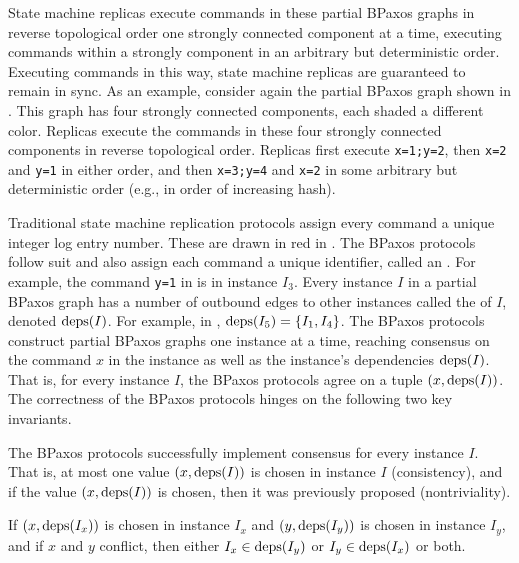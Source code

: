 State machine replicas execute commands in these partial BPaxos graphs in
reverse topological order one strongly connected component at a time, executing
commands within a strongly component in an arbitrary but deterministic order.
Executing commands in this way, state machine replicas are guaranteed to remain
in sync. As an example, consider again the partial BPaxos graph shown in
. This graph has four strongly connected components, each
shaded a different color. Replicas execute the commands in these four strongly
connected components in reverse topological order. Replicas first execute
\texttt{x=1;y=2}, then \texttt{x=2} and \texttt{y=1} in either order, and then
\texttt{x=3;y=4} and \texttt{x=2} in some arbitrary but deterministic order
(e.g., in order of increasing hash).

Traditional state machine replication protocols assign every command a unique
integer log entry number. These are drawn in red in . The
BPaxos protocols follow suit and also assign each command a unique identifier,
called an . For example, the command \texttt{y=1} in
 is in instance $I_3$. Every instance $I$ in a partial BPaxos
graph has a number of outbound edges to other instances called the
 of $I$, denoted $\text{deps}(I)$. For example, in
, $\text{deps}(I_5) = \{I_1, I_4\}$.
%
The BPaxos protocols construct partial BPaxos graphs one instance at a time,
reaching consensus on the command $x$ in the instance as well as the instance's
dependencies $\text{deps}(I)$. That is, for every instance $I$, the BPaxos protocols
agree on a tuple $(x, \text{deps}(I))$.
%
The correctness of the BPaxos protocols hinges on the following two key
invariants.

\begin{invariant}
  The BPaxos protocols successfully implement consensus for every instance $I$.
  That is, at most one value $(x, \text{deps}(I))$ is chosen in instance $I$
  (consistency), and if the value $(x, \text{deps}(I))$ is chosen, then it was
  previously proposed (nontriviality).
\end{invariant}%
%
\begin{invariant}
  If $(x, \text{deps}(I_x))$ is chosen in instance $I_x$ and $(y, \text{deps}(I_y))$ is
  chosen in instance $I_y$, and if $x$ and $y$ conflict, then either $I_x \in
  \text{deps}(I_y)$ or $I_y \in \text{deps}(I_x)$ or both.
\end{invariant}

